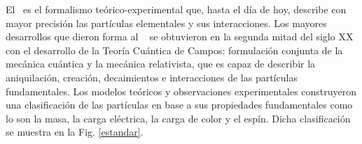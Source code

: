 El \ME~es el formalismo teórico-experimental que, hasta el día de hoy, describe con mayor precisión las partículas elementales y sus interacciones. Los mayores desarrollos que dieron forma al \ME~ se obtuvieron en la segunda mitad del siglo XX con el desarrollo de la Teoría Cuántica de Campos: formulación conjunta de la mecánica cuántica y la mecánica relativista, que es capaz de describir la aniquilación, creación, decaimientos e interacciones de las partículas fundamentales. Los modelos teóricos y observaciones experimentales construyeron una clasificación de las partículas en base a sus propiedades fundamentales como lo son la masa, la carga eléctrica, la carga de color y el espín. Dicha clasificación se muestra en la Fig. \ref{estandar}. 



